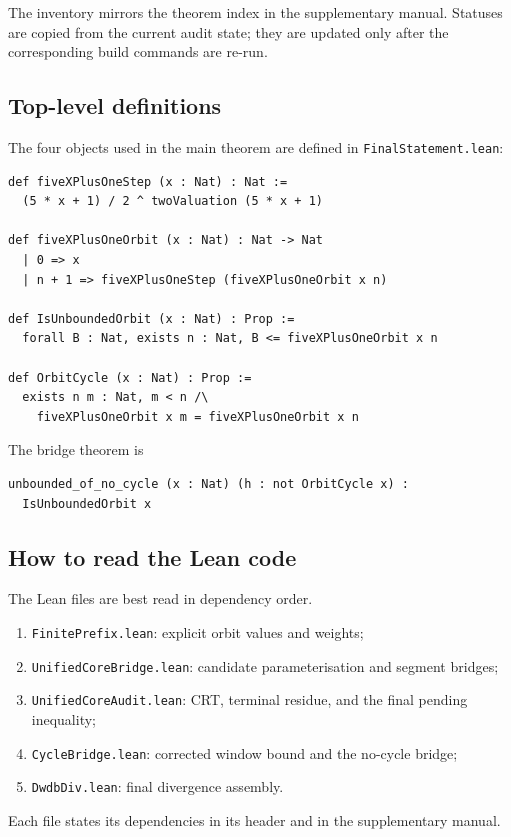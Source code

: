 The inventory mirrors the theorem index in the supplementary manual.
Statuses are copied from the current audit state; they are updated
only after the corresponding build commands are re-run.

\subsection{Top-level definitions}

The four objects used in the main theorem are defined in
\texttt{FinalStatement.lean}:
\begin{verbatim}
def fiveXPlusOneStep (x : Nat) : Nat :=
  (5 * x + 1) / 2 ^ twoValuation (5 * x + 1)

def fiveXPlusOneOrbit (x : Nat) : Nat -> Nat
  | 0 => x
  | n + 1 => fiveXPlusOneStep (fiveXPlusOneOrbit x n)

def IsUnboundedOrbit (x : Nat) : Prop :=
  forall B : Nat, exists n : Nat, B <= fiveXPlusOneOrbit x n

def OrbitCycle (x : Nat) : Prop :=
  exists n m : Nat, m < n /\
    fiveXPlusOneOrbit x m = fiveXPlusOneOrbit x n
\end{verbatim}

The bridge theorem is
\begin{verbatim}
unbounded_of_no_cycle (x : Nat) (h : not OrbitCycle x) :
  IsUnboundedOrbit x
\end{verbatim}

\subsection{How to read the Lean code}

The Lean files are best read in dependency order.
\begin{enumerate}[leftmargin=*]
\item \texttt{FinitePrefix.lean}: explicit orbit values and weights;
\item \texttt{UnifiedCoreBridge.lean}: candidate parameterisation and
  segment bridges;
\item \texttt{UnifiedCoreAudit.lean}: CRT, terminal residue, and the
  final pending inequality;
\item \texttt{CycleBridge.lean}: corrected window bound and the
  no-cycle bridge;
\item \texttt{DwdbDiv.lean}: final divergence assembly.
\end{enumerate}
Each file states its dependencies in its header and in the
supplementary manual.

